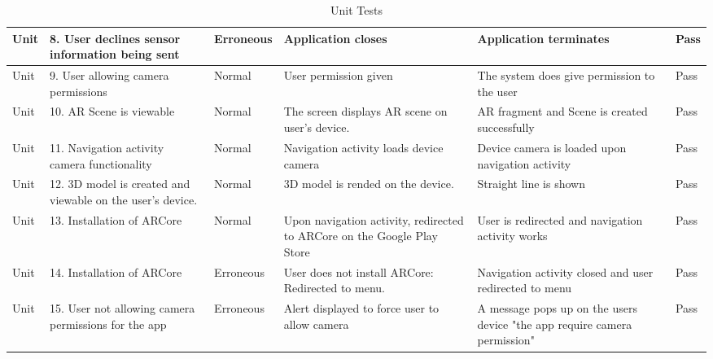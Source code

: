 \begin{sidewaystable}
\begin{longtable}{|p{2cm}|p{5cm}|l|p{5cm}|p{5cm}|l|}
Unit          & 8. User declines sensor information being sent                         & Erroneous      & Application closes            & Application terminates                                                    & Pass            \\ \hline
Unit          & 9. User allowing camera permissions                                    & Normal         & User permission given                                                   & The system does give permission to the user                               & Pass            \\ \hline
Unit          & 10. AR Scene is viewable                                               & Normal         & The screen displays AR scene on user's device.                          & AR fragment and Scene is created successfully                             & Pass            \\ \hline
Unit          & 11. Navigation activity camera functionality                           & Normal         & Navigation activity loads device camera                                 & Device camera is loaded upon navigation activity                          & Pass            \\ \hline
Unit          & 12. 3D model is created and viewable on the user's device.             & Normal         & 3D model is rended on the device.                                       & Straight line is shown                                                    & Pass            \\ \hline
Unit          & 13. Installation of ARCore                                             & Normal         & Upon navigation activity, redirected to ARCore on the Google Play Store & User is redirected and navigation activity works                          & Pass            \\ \hline
Unit          & 14. Installation of ARCore                                             & Erroneous      & User does not install ARCore: Redirected to menu.                       & Navigation activity closed and user redirected to menu                    & Pass            \\ \hline
Unit          & 15. User not allowing camera permissions for the app                   & Erroneous      & Alert displayed to force user to allow camera                           & A message pops up on the users device "the app require camera permission" & Pass            \\
\bottomrule
\end{longtable}
\caption{Unit Tests}
\label{table:unittests}
\end{sidewaystable}

